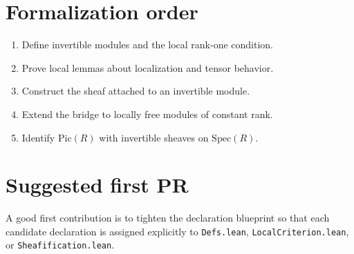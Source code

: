 \documentclass[11pt]{article}
\begin{document}
\section{Formalization order}

\begin{enumerate}
\item Define invertible modules and the local rank-one condition.
\item Prove local lemmas about localization and tensor behavior.
\item Construct the sheaf attached to an invertible module.
\item Extend the bridge to locally free modules of constant rank.
\item Identify $\mathrm{Pic}(R)$ with invertible sheaves on $\mathrm{Spec}(R)$.
\end{enumerate}

\section{Suggested first PR}

A good first contribution is to tighten the declaration blueprint so that each
candidate declaration is assigned explicitly to \texttt{Defs.lean},
\texttt{LocalCriterion.lean}, or \texttt{Sheafification.lean}.
\end{document}
